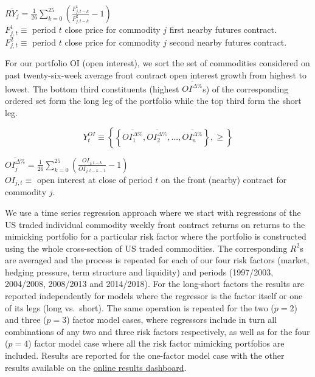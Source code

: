 \documentclass[]{elsarticle} %
\begin{document}
\(\overline{RY_{j}}=\frac{1}{26}\sum_{k=0}^{25}(\frac{F_{j,t-k}^{1}}{F_{j,t-k}^{2}} - 1)\)\\
\(F_{j,t}^{1}\equiv\) period \(t\) close price for commodity \(j\) first nearby futures contract.\\
\(F_{j,t}^{2}\equiv\) period \(t\) close price for commodity \(j\) second nearby futures contract.

\medskip\setlength{\parindent}{0pt}

For our portfolio OI (open interest), we sort the set of commodities considered on past twenty-six-week average front contract open interest growth from highest to lowest. The bottom third constituents (highest \(\overline{OI^{\Delta \%}}\)s) of the corresponding ordered set form the long leg of the portfolio while the top third form the short leg.

\[Y_{t}^{OI}\equiv\left \{ \left \{ \overline{{OI}_{1}^{\Delta \%}}, \overline{{OI}_{2}^{\Delta \%}}, ..., \overline{{OI}_{n}^{\Delta \%}} \right \}, \geq \right \}\]

\(\overline{{OI}_{j}^{\Delta \%}}=\frac{1}{26}\sum_{k=0}^{25}(\frac{{OI}_{j,t-k}}{{OI}_{j,t-k-1}} - 1)\)\\
\(OI_{j,t}\equiv\) open interest at close of period \(t\) on the front (nearby) contract for commodity \(j\).

\medskip\setlength{\parindent}{0pt}

We use a time series regression approach where we start with regressions of the US traded individual commodity weekly front contract returns on returns to the mimicking portfolio for a particular risk factor where the portfolio is constructed using the whole cross-section of US traded commodities. The corresponding \(R^{2}\)s are averaged and the process is repeated for each of our four risk factors (market, hedging pressure, term structure and liquidity) and periods (1997/2003, 2004/2008, 2008/2013 and 2014/2018). For the long-short factors the results are reported independently for models where the regressor is the factor itself or one of its legs (long vs.~short). The same operation is repeated for the two (\(p=2\)) and three (\(p=3\)) factor model cases, where regressors include in turn all combinations of any two and three risk factors respectively, as well as for the four (\(p=4\)) factor model case where all the risk factor mimicking portfolios are included. Results are reported for the one-factor model case with the other results available on the \href{http://18.135.131.217:3838/financialization-asset-pricing/}{online results dashboard}.
\end{document}
